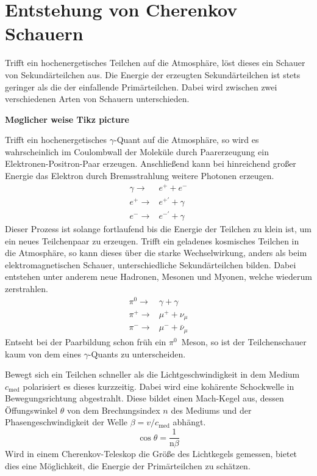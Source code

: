 \chapter{Entstehung von Cherenkov Schauern}
Trifft ein hochenergetisches Teilchen auf die Atmosphäre, löst dieses ein Schauer von Sekundärteilchen aus. Die Energie der erzeugten Sekundärteilchen ist stets geringer als die der einfallende Primärteilchen. Dabei wird zwischen zwei verschiedenen Arten von Schauern unterschieden. 

\textbf{Møglicher weise Tikz picture}

Trifft ein hochenergetisches $\gamma$-Quant auf die Atmosphäre, so wird es wahrscheinlich im Coulombwall der Moleküle durch Paarerzeugung ein Elektronen-Positron-Paar erzeugen. 
Anschließend kann bei hinreichend großer Energie das Elektron durch Bremsstrahlung weitere Photonen erzeugen. 
\begin{eqnarray}
  \gamma \rightarrow& e^{+} + e^{-} \\
  e^{+} \rightarrow& e^{+'} + \gamma \\
  e^{-} \rightarrow& e^{-'} + \gamma 
\end{eqnarray}
Dieser Prozess ist solange fortlaufend bis die Energie der Teilchen zu klein ist, um ein neues Teilchenpaar zu erzeugen. 
Trifft ein geladenes kosmisches Teilchen in die Atmosphäre, so kann dieses über die starke Wechselwirkung, anders als beim elektromagnetischen Schauer, unterschiedliche Sekundärteilchen bilden. 
Dabei entstehen unter anderem neue Hadronen, Mesonen und Myonen, welche wiederum zerstrahlen. 
\begin{eqnarray}
  \pi^{0} \rightarrow& \gamma + \gamma \\
  \pi^{+} \rightarrow& \mu^{+} + \nu_{\mu} \\
  \pi^{-} \rightarrow& \mu^{-} + \bar{\nu}_{\mu}
\end{eqnarray}
Entseht bei der Paarbildung schon früh ein $\pi^{0}$~Meson, so ist der Teilchenschauer kaum von dem eines $\gamma$-Quants zu unterscheiden. 

Bewegt sich ein Teilchen schneller als die Lichtgeschwindigkeit in dem Medium $c_\text{med}$ polarisiert es dieses kurzzeitig. 
Dabei wird eine kohärente Schockwelle in Bewegungsrichtung abgestrahlt. 
Diese bildet einen Mach-Kegel aus, dessen Öffungswinkel $\theta$ von dem Brechungsindex $n$ des Mediums und der Phasengeschwindigkeit der Welle $\beta = v / c_\text{med}$ abhängt.
\begin{equation}
  \cos  \theta = \frac{1}{\text{n} \beta}
\end{equation}
Wird in einem Cherenkov-Teleskop die Größe des Lichtkegels gemessen, bietet dies eine Möglichkeit, die Energie der Primärteilchen zu schätzen. 

